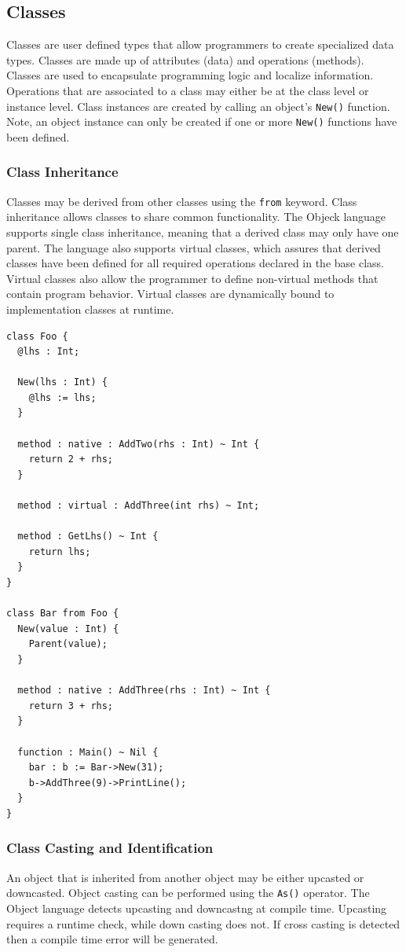 \documentclass[12pt]{article}
\begin{document}
\subsection{Classes}
Classes are user defined types that allow programmers to create specialized data types.  Classes are made up of attributes (data) and operations (methods).  Classes are used to encapsulate programming logic and localize information.  Operations that are associated to a class may either be at the class level or instance level.  Class instances are created by calling an object's \texttt{New()} function.  Note, an object instance can only be created if one or more \texttt{New()} functions have been defined.

\subsubsection{Class Inheritance}
Classes may be derived from other classes using the \texttt{from} keyword.  Class inheritance allows classes to share common functionality.  The Objeck language supports single class inheritance, meaning that a derived class may only have one parent.  The language also supports virtual classes, which assures that derived classes have been defined for all required operations declared in the base class.  Virtual classes also allow the programmer to define non-virtual methods that contain program behavior.  Virtual classes are dynamically bound to implementation classes at runtime.
\begin{verbatim}
class Foo {
  @lhs : Int;

  New(lhs : Int) {
    @lhs := lhs;
  }

  method : native : AddTwo(rhs : Int) ~ Int {
    return 2 + rhs;
  }

  method : virtual : AddThree(int rhs) ~ Int;

  method : GetLhs() ~ Int {
    return lhs;
  }
}

class Bar from Foo {
  New(value : Int) {
    Parent(value);
  }

  method : native : AddThree(rhs : Int) ~ Int {
    return 3 + rhs;
  }

  function : Main() ~ Nil {
    bar : b := Bar->New(31);
    b->AddThree(9)->PrintLine();
  }
}
\end{verbatim}

\subsubsection{Class Casting and Identification}
An object that is inherited from another object may be either upcasted or downcasted.  Object casting can be performed using the \texttt{As()} operator.  The Object language detects upcasting and downcastng at compile time. Upcasting requires a runtime check, while down casting does not. If cross casting is detected then a compile time error will be generated.
\end{document}

